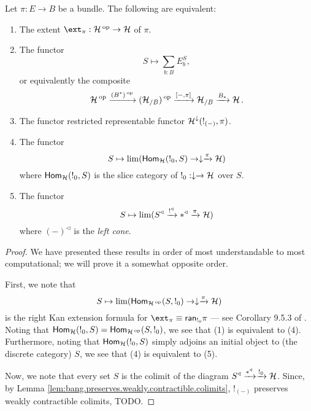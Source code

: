 \begin{prop}\label{prop:set.characterizing.extent}
  Let $\pi : E \to B$ be a bundle. The following are equivalent:
  \begin{enumerate}
  \item The extent $\ext_{\pi} : \Ha\op \to \Ha$ of $\pi$.
  \item The functor
    $$S \mapsto \sum_{b : B} E_b^S,$$
    or equivalently the composite
  $$\operatorname{\mathcal{H}}\operatorname{^\text{op}} \xrightarrow{(B^{\ast})\operatorname{^\text{op}}} (\operatorname{\mathcal{H}}_{/B})\operatorname{^\text{op}} \xrightarrow{[-, \pi]} \operatorname{\mathcal{H}}_{/B}
  \xrightarrow{B_{\ast}} \operatorname{\mathcal{H}}.$$
\item The functor restricted representable functor
  $\operatorname{\mathcal{H}}^{\downarrow}(!_{(-)}, \pi)$.
\item The functor
  $$S \mapsto \lim(\operatorname{\mathsf{Hom}}_{\operatorname{\mathcal{H}}}(!_0, S) \to \downarrow \xrightarrow{\pi} \operatorname{\mathcal{H}})$$
  where $\operatorname{\mathsf{Hom}}_{\operatorname{\mathcal{H}}}(!_0, S)$ is the slice category of $!_0 : \downarrow \to
  \operatorname{\mathcal{H}}$ over $S$.
\item The functor
  $$S \mapsto \lim(S^{\triangleleft} \xrightarrow{!^{\triangleleft}} \ast^{\triangleleft}
  \xrightarrow{\pi} \operatorname{\mathcal{H}})$$
  where $(-)^{\triangleleft}$ is the \emph{left cone}.
  \end{enumerate}
\end{prop}
\begin{proof}
We have presented these results in order of most understandable to most
computational; we will prove it a somewhat opposite order.

First, we note that 
$$S \mapsto \lim(\operatorname{\mathsf{Hom}}_{\operatorname{\mathcal{H}}\operatorname{^\text{op}}}(S, !_0) \to \downarrow \xrightarrow{\pi} \operatorname{\mathcal{H}})$$
is the right Kan extension formula for $\ext_{\pi} \equiv
\term{ran}_{!_0} \pi$ --- see Corollary 9.5.3 of \cite{RV:Elements}. Noting that $\operatorname{\mathsf{Hom}}_{\operatorname{\mathcal{H}}}(!_0, S) = \operatorname{\mathsf{Hom}}_{\operatorname{\mathcal{H}}\operatorname{^\text{op}}}(S,
!_0)$, we see that (1) is equivalent to (4). Furthermore, noting that
$\operatorname{\mathsf{Hom}}_{\operatorname{\mathcal{H}}}(!_0, S)$ simply adjoins an initial object to (the discrete
category) $S$, we see that (4) is equivalent to (5).

Now, we note that every set $S$ is the colimit of the diagram $S^{\triangleleft}
\xrightarrow{\ast^{\triangleleft}} \xrightarrow{!_0} \operatorname{\mathcal{H}}$. Since, by Lemma \ref{lem:bang.preserves.weakly.contractible.colimits}, $!_{(-)}$
preserves weakly contractible colimits, {\color{red} TODO}.
\end{proof}

